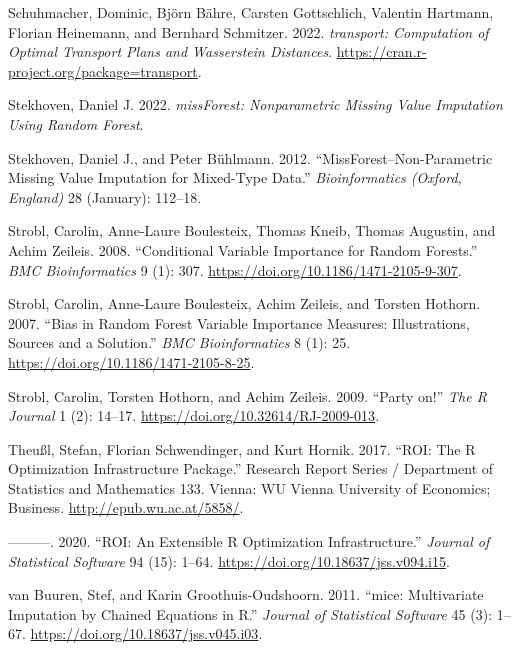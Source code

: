 \begin{CSLReferences}{1}{0}
\leavevmode{}%
Schuhmacher, Dominic, Björn Bähre, Carsten Gottschlich, Valentin Hartmann, Florian Heinemann, and Bernhard Schmitzer. 2022. \emph{{transport}: Computation of Optimal Transport Plans and Wasserstein Distances}. \url{https://cran.r-project.org/package=transport}.

\leavevmode{}%
Stekhoven, Daniel J. 2022. \emph{missForest: Nonparametric Missing Value Imputation Using Random Forest}.

\leavevmode{}%
Stekhoven, Daniel J., and Peter Bühlmann. 2012. {``MissForest--Non-Parametric Missing Value Imputation for Mixed-Type Data.''} \emph{Bioinformatics (Oxford, England)} 28 (January): 112--18.

\leavevmode{}%
Strobl, Carolin, Anne-Laure Boulesteix, Thomas Kneib, Thomas Augustin, and Achim Zeileis. 2008. {``Conditional Variable Importance for Random Forests.''} \emph{BMC Bioinformatics} 9 (1): 307. \url{https://doi.org/10.1186/1471-2105-9-307}.

\leavevmode{}%
Strobl, Carolin, Anne-Laure Boulesteix, Achim Zeileis, and Torsten Hothorn. 2007. {``Bias in Random Forest Variable Importance Measures: Illustrations, Sources and a Solution.''} \emph{BMC Bioinformatics} 8 (1): 25. \url{https://doi.org/10.1186/1471-2105-8-25}.

\leavevmode{}%
Strobl, Carolin, Torsten Hothorn, and Achim Zeileis. 2009. {``{Party on!}''} \emph{{The R Journal}} 1 (2): 14--17. \url{https://doi.org/10.32614/RJ-2009-013}.

\leavevmode{}%
Theußl, Stefan, Florian Schwendinger, and Kurt Hornik. 2017. {``ROI: The {R} Optimization Infrastructure Package.''} Research Report Series / Department of Statistics and Mathematics 133. Vienna: WU Vienna University of Economics; Business. \url{http://epub.wu.ac.at/5858/}.

\leavevmode{}%
---------. 2020. {``{ROI}: An Extensible {R} Optimization Infrastructure.''} \emph{Journal of Statistical Software} 94 (15): 1--64. \url{https://doi.org/10.18637/jss.v094.i15}.

\leavevmode{}%
van Buuren, Stef, and Karin Groothuis-Oudshoorn. 2011. {``{mice}: Multivariate Imputation by Chained Equations in {R}.''} \emph{Journal of Statistical Software} 45 (3): 1--67. \url{https://doi.org/10.18637/jss.v045.i03}.


\end{CSLReferences}
